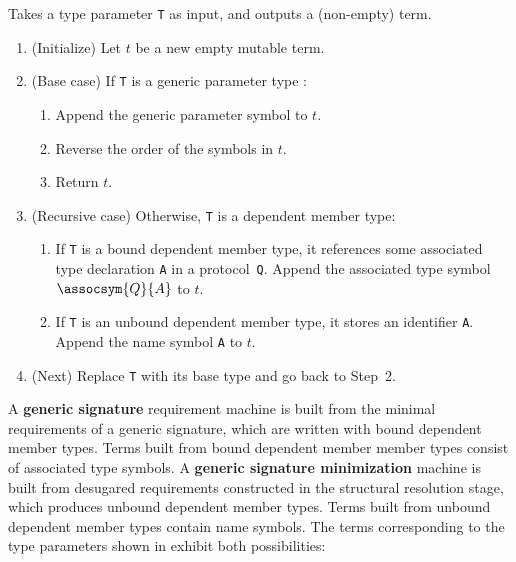 \documentclass[../generics]{subfiles}
\begin{document}
\begin{algorithm}\label{build term generic}
Takes a type parameter \texttt{T} as input, and outputs a (non-empty) term.
\begin{enumerate}
\item (Initialize) Let $t$ be a new empty mutable term.
\item (Base case) If \texttt{T} is a generic parameter type :
\begin{enumerate}
\item Append the generic parameter symbol  to $t$.
\item Reverse the order of the symbols in $t$.
\item Return $t$.
\end{enumerate}
\item (Recursive case) Otherwise, \texttt{T} is a dependent member type:
\begin{enumerate}
\item If \texttt{T} is a bound dependent member type, it references some associated type declaration \texttt{A} in a protocol~\texttt{Q}. Append the associated type symbol $\assocsym{Q}{A}$ to $t$.
\item If \texttt{T} is an unbound dependent member type, it stores an identifier \texttt{A}. Append the name symbol \texttt{A} to $t$.
\end{enumerate}
\item (Next) Replace \texttt{T} with its base type and go back to Step~2.
\end{enumerate}
\end{algorithm}
%
A \textbf{generic signature} requirement machine is built from the minimal requirements of a generic signature, which are written with bound dependent member types. Terms built from bound dependent member member types consist of associated type symbols. A \textbf{generic signature minimization} machine is built from desugared requirements constructed in the structural resolution stage, which produces unbound dependent member types. Terms built from unbound dependent member types contain name symbols. The terms corresponding to the type parameters shown in  exhibit both possibilities:
\end{document}
